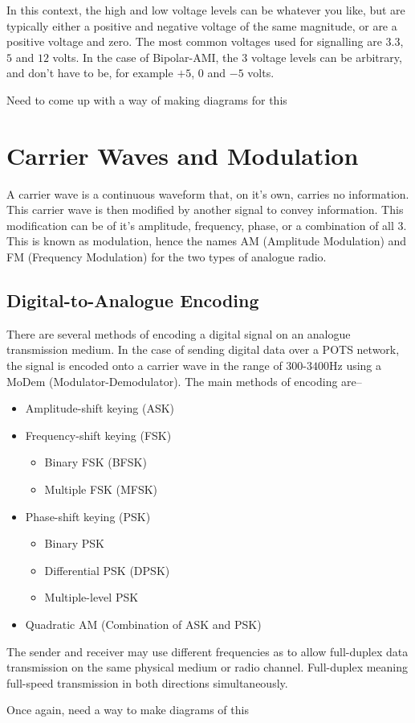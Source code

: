 In this context, the high and low voltage levels can be whatever you like, but are typically either a positive and
 negative voltage of the same magnitude, or are a positive voltage and zero. The most common voltages used for
 signalling are $3.3$, $5$ and $12$ volts. In the case of Bipolar-AMI, the 3 voltage levels can be arbitrary, and don't
 have to be, for example $+5$, $0$ and $-5$ volts.

{\Huge Need to come up with a way of making diagrams for this} 

\section*{Carrier Waves and Modulation}

A carrier wave is a continuous waveform that, on it's own, carries no information. This carrier wave is then modified
 by another signal to convey information. This modification can be of it's amplitude, frequency, phase, or a combination
 of all 3. This is known as modulation, hence the names AM (Amplitude Modulation) and FM (Frequency Modulation) for the
 two types of analogue radio.

\subsection*{Digital-to-Analogue Encoding}

There are several methods of encoding a digital signal on an analogue transmission medium. In the case of sending
 digital data over a POTS network, the signal is encoded onto a carrier wave in the range of $300$-$3400$Hz using a
 MoDem (Modulator-Demodulator). The main methods of encoding are--

\begin{itemize}
  \item Amplitude-shift keying (ASK)
  \item Frequency-shift keying (FSK)
  \begin{itemize}
    \item Binary FSK (BFSK)
    \item Multiple FSK (MFSK)
  \end{itemize}
  \item Phase-shift keying (PSK)
  \begin{itemize}
    \item Binary PSK
    \item Differential PSK (DPSK)
    \item Multiple-level PSK
  \end{itemize}
  \item Quadratic AM (Combination of ASK and PSK)
\end{itemize}

The sender and receiver may use different frequencies as to allow full-duplex data transmission on the same physical
 medium or radio channel. Full-duplex meaning full-speed transmission in both directions simultaneously.

{\Huge Once again, need a way to make diagrams of this}